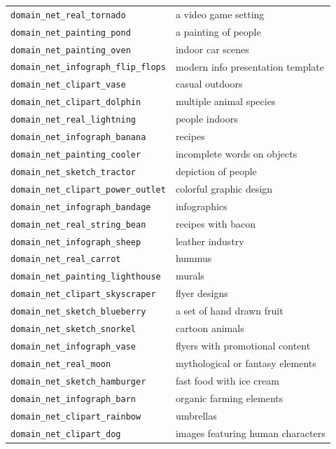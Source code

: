 \documentclass{article} %
\begin{document}
\begin{longtable}{p{} p{}}
\texttt{domain\_net\_real\_tornado} & a video game setting \\
\texttt{domain\_net\_painting\_pond} & a painting of people \\
\texttt{domain\_net\_painting\_oven} & indoor car scenes \\
\texttt{domain\_net\_infograph\_flip\_flops} & modern info presentation template \\
\texttt{domain\_net\_clipart\_vase} & casual outdoors \\
\texttt{domain\_net\_clipart\_dolphin} & multiple animal species \\
\texttt{domain\_net\_real\_lightning} & people indoors \\
\texttt{domain\_net\_infograph\_banana} & recipes \\
\texttt{domain\_net\_painting\_cooler} & incomplete words on objects \\
\texttt{domain\_net\_sketch\_tractor} & depiction of people \\
\texttt{domain\_net\_clipart\_power\_outlet} & colorful graphic design \\
\texttt{domain\_net\_infograph\_bandage} & infographics \\
\texttt{domain\_net\_real\_string\_bean} & recipes with bacon \\
\texttt{domain\_net\_infograph\_sheep} & leather industry \\
\texttt{domain\_net\_real\_carrot} & hummus \\
\texttt{domain\_net\_painting\_lighthouse} & murals \\
\texttt{domain\_net\_clipart\_skyscraper} & flyer designs \\
\texttt{domain\_net\_sketch\_blueberry} & a set of hand drawn fruit \\
\texttt{domain\_net\_sketch\_snorkel} & cartoon animals \\
\texttt{domain\_net\_infograph\_vase} & flyers with promotional content \\
\texttt{domain\_net\_real\_moon} & mythological or fantasy elements \\
\texttt{domain\_net\_sketch\_hamburger} & fast food with ice cream \\
\texttt{domain\_net\_infograph\_barn} & organic farming elements \\
\texttt{domain\_net\_clipart\_rainbow} & umbrellas \\
\texttt{domain\_net\_clipart\_dog} & images featuring human characters \\

\end{longtable}
\end{document}
